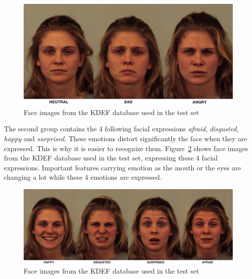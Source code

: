 \begin{figure}[!h]
\begin{center}
\noindent \includegraphics[scale=0.4]{figures/kdef_no_difference_emotions} 
\newline
\caption{Face images from the KDEF database used in the test set}
\label{kdef_no_difference_emotions}
\end{center} 
\end{figure}

\noindent The second group contains the 4 following facial expressions \textit{afraid}, \textit{disgusted}, \textit{happy} and \textit{surprised}. These emotions distort significantly the face when they are expressed. This is why it is easier to recognize them. Figure~\ref{kdef_difference_emotions} shows face images from the KDEF database used in the test set, expressing these 4 facial expressions. Important features carrying emotion as the mouth or the eyes are changing a lot while these 4 emotions are expressed.
\newline

\begin{figure}[!h]
\begin{center}
\noindent \includegraphics[scale=0.3]{figures/kdef_difference_emotions} 
\newline
\caption{Face images from the KDEF database used in the test set}
\label{kdef_difference_emotions}
\end{center} 
\end{figure}

